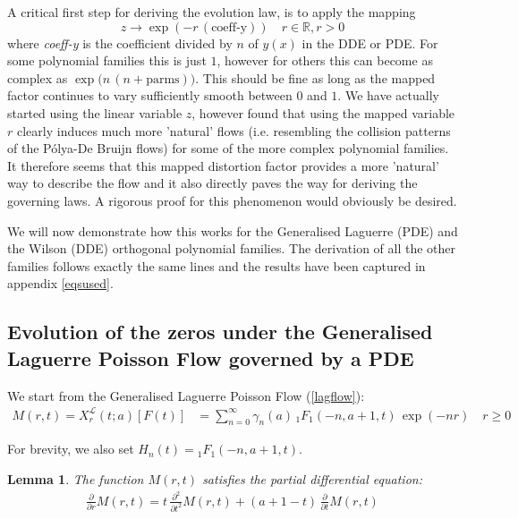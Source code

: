 \documentclass[a4paper,11pt,twoside]{amsart}
\newtheorem{lemma}[theorem]{Lemma}
\newcommand{\verifiedeq}{=}
\newcommand{\defeq}{=}
\newcommand{\verifiedeq}{\stackrel{\checkmark}{=}}
\newcommand{\defeq}{\stackrel{\scriptscriptstyle \textnormal{def}}{=}}
\begin{document}
A critical first step for deriving the evolution law, is to apply the mapping $$z \rightarrow \exp\left(-r\,(\text{coeff-y})\right) \quad r \in \mathbb{R}, r > 0$$ where \textit{coeff-y} is the coefficient divided by $n$ of $y(x)$ in the DDE or PDE. For some polynomial families this is just $1$, however for others this can become as complex as $\exp\big(n\,(n+\text{parms})\big)$. This should be fine as long as the mapped factor continues to vary sufficiently smooth between $0$ and $1$. We have actually started using the linear variable $z$, however found that using the mapped variable $r$ clearly induces much more 'natural' flows (i.e. resembling the collision patterns of the Pólya-De Bruijn flows) for some of the more complex polynomial families. It therefore seems that this mapped distortion factor provides a more 'natural' way to describe the flow and it also directly paves the way for deriving the governing laws. A rigorous proof for this phenomenon would obviously be desired.    

We will now demonstrate how this works for the Generalised Laguerre (PDE) and the Wilson (DDE) orthogonal polynomial families. The derivation of all the other families follows exactly the same lines and the results have been captured in appendix \ref{eqsused}.

\subsection{Evolution of the zeros under the Generalised Laguerre Poisson Flow governed by a PDE} \label{Laguerrelawspoissonflow}
We start from the Generalised Laguerre Poisson Flow (\ref{lagflow}):
\begin{align}
  M(r,t)=  X^{\mathcal{L}}_r(t;a)\left[F(t)\right] &\verifiedeq \sum_{n=0}^\infty \gamma_n(a)\,{}_1F_1\left(-n, a+1,t\right)\,\exp(-nr)\quad r \ge 0
\end{align} 

For brevity, we also set $H_n(t) \defeq {}_1F_1\left(-n, a+1,t\right)$. 

\begin{lemma}\label{proofBes1} The function $M(r,t)$ satisfies the partial differential equation: 
\begin{align}
 \frac{\partial}{\partial r}M(r,t) \verifiedeq t\,\frac{\partial^2}{\partial t^2}M(r,t) + (a+1-t)\,\frac{\partial }{\partial t}M(r,t)
\end{align}
\end{lemma}
\end{document}
